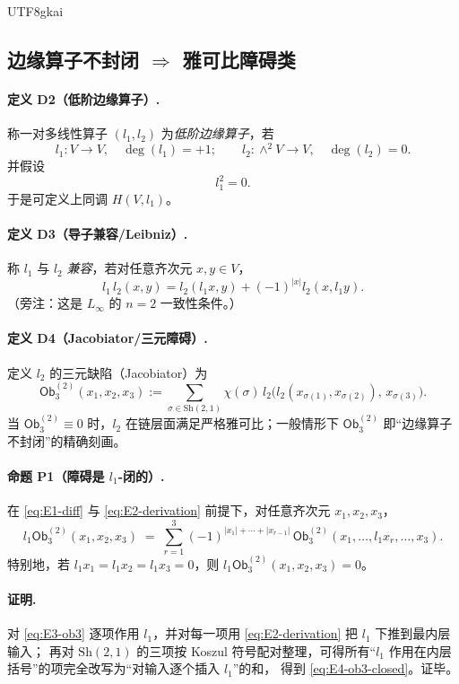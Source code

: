 \documentclass[12pt]{article}
\newcommand{\Ob}{\ensuremath{\mathsf{Ob}}}
\begin{document}
\begin{CJK*}{UTF8}{gkai}
\subsection{边缘算子不封闭 $\Rightarrow$ 雅可比障碍类}
\label{subsec:edge-op-jacobi-obstruction}

\paragraph{定义 D2（低阶边缘算子）.}
称一对多线性算子 $(l_1,l_2)$ 为\emph{低阶边缘算子}，若
\[
l_1:V\to V,\quad \deg(l_1)=+1;\qquad
l_2:\wedge^2 V\to V,\quad \deg(l_2)=0.
\]
并假设
\[
l_1^2=0.
\tag{E1}
\label{eq:E1-diff}
\]
于是可定义上同调 $H(V,l_1)$。

\paragraph{定义 D3（导子兼容/Leibniz）.}
称 $l_1$ 与 $l_2$ \emph{兼容}，若对任意齐次元 $x,y\in V$，
\[
l_1\,l_2(x,y)=l_2(l_1x,y)+(-1)^{|x|}l_2(x,l_1y).
\tag{E2}
\label{eq:E2-derivation}
\]
（旁注：这是 $L_\infty$ 的 $n=2$ 一致性条件。）

\paragraph{定义 D4（Jacobiator/三元障碍）.}
定义 $l_2$ 的三元缺陷（Jacobiator）为
\[
\Ob_3^{(2)}(x_1,x_2,x_3)
:=\sum_{\sigma\in \mathrm{Sh}(2,1)}\chi(\sigma)\,
l_2\!\bigl(l_2(x_{\sigma(1)},x_{\sigma(2)}),\,x_{\sigma(3)}\bigr).
\tag{E3}
\label{eq:E3-ob3}
\]
当 $\Ob_3^{(2)}\equiv 0$ 时，$l_2$ 在链层面满足严格雅可比；一般情形下 $\Ob_3^{(2)}$ 即“边缘算子不封闭”的精确刻画。

\paragraph{命题 P1（障碍是 $l_1$-闭的）.}
在 \eqref{eq:E1-diff} 与 \eqref{eq:E2-derivation} 前提下，对任意齐次元 $x_1,x_2,x_3$，
\[
l_1\Ob_3^{(2)}(x_1,x_2,x_3)
\;=\;
\sum_{r=1}^3 (-1)^{|x_1|+\cdots+|x_{r-1}|}\,
\Ob_3^{(2)}(x_1,\dots,l_1x_r,\dots,x_3).
\tag{E4}
\label{eq:E4-ob3-closed}
\]
特别地，若 $l_1x_1=l_1x_2=l_1x_3=0$，则 $l_1\Ob_3^{(2)}(x_1,x_2,x_3)=0$。

\paragraph{证明.}
对 \eqref{eq:E3-ob3} 逐项作用 $l_1$，并对每一项用 \eqref{eq:E2-derivation} 把 $l_1$ 下推到最内层输入；
再对 $\mathrm{Sh}(2,1)$ 的三项按 Koszul 符号配对整理，可得所有“$l_1$ 作用在内层括号”的项完全改写为“对输入逐个插入 $l_1$”的和，
得到 \eqref{eq:E4-ob3-closed}。证毕。


\end{CJK*}
\end{document}

